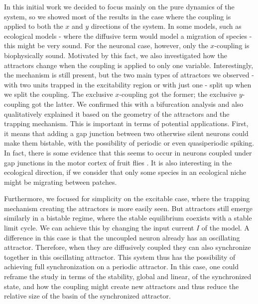In this initial work we decided to focus mainly on the pure dynamics of the system, so we showed most of the results in the case where the coupling is applied to both the $x$ and $y$ directions of the system. In some models, such as ecological models - where the diffusive term would model a migration of species - this might be very sound. For the neuronal case, however, only the $x$-coupling is biophysically sound. Motivated by this fact, we also investigated how the attractors change when the coupling is applied to only one variable. Interestingly, the mechanism is still present, but the two main types of attractors we observed - with two units trapped in the excitability region or with just one - split up when we split the coupling. The exclusive $x$-coupling got the former; the exclusive $y$-coupling got the latter. We confirmed this with a bifurcation analysis and also qualitatively explained it based on the geometry of the attractors and the trapping mechanism. This is important in terms of potential applications. First, it means that adding a gap junction between two otherwise silent neurons could make them bistable, with the possibility of periodic or even quasiperiodic spiking. In fact, there is some evidence that this seems to occur in neurons coupled under gap junctions in the motor cortex of fruit flies \cite{hurkey2023gap}. It is also interesting in the ecological direction, if we consider that only some species in an ecological niche might be migrating between patches.

Furthermore, we focused for simplicity on the excitable case, where the trapping mechanism creating the attractors is more easily seen. But attractors still emerge similarly in a bistable regime, where the stable equilibrium coexists with a stable limit cycle. We can achieve this by changing the input current $I$ of the model. A difference in this case is that the uncoupled neuron already has an oscillating attractor. Therefore, when they are diffusively coupled they can also synchronize together in this oscillating attractor. This system thus has the possibility of achieving full synchronization on a periodic attractor. In this case, one could reframe the study in terms of the stability, global and linear, of the synchronized state, and how the coupling might create new attractors and thus reduce the relative size of the basin of the synchronized attractor.

